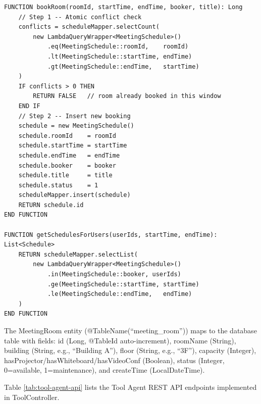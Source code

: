 \begin{table}[H]
\small\singlespacing
\centering
\caption{Pseudocode --- bookRoom() Atomic Conflict Check-and-Insert}
\label{tab:pseudocode-book-room}
\vspace{2mm}

\begin{lstlisting}
FUNCTION bookRoom(roomId, startTime, endTime, booker, title): Long
    // Step 1 -- Atomic conflict check
    conflicts = scheduleMapper.selectCount(
        new LambdaQueryWrapper<MeetingSchedule>()
            .eq(MeetingSchedule::roomId,    roomId)
            .lt(MeetingSchedule::startTime, endTime)
            .gt(MeetingSchedule::endTime,   startTime)
    )
    IF conflicts > 0 THEN
        RETURN FALSE   // room already booked in this window
    END IF
    // Step 2 -- Insert new booking
    schedule = new MeetingSchedule()
    schedule.roomId    = roomId
    schedule.startTime = startTime
    schedule.endTime   = endTime
    schedule.booker    = booker
    schedule.title     = title
    schedule.status    = 1
    scheduleMapper.insert(schedule)
    RETURN schedule.id
END FUNCTION

FUNCTION getSchedulesForUsers(userIds, startTime, endTime): List<Schedule>
    RETURN scheduleMapper.selectList(
        new LambdaQueryWrapper<MeetingSchedule>()
            .in(MeetingSchedule::booker, userIds)
            .ge(MeetingSchedule::startTime, startTime)
            .le(MeetingSchedule::endTime,   endTime)
    )
END FUNCTION
\end{lstlisting}
\end{table}


The MeetingRoom entity (@TableName(``meeting\_room'')) maps to the database table with fields: id (Long, @TableId auto-increment), roomName (String), building (String, e.g., ``Building A''), floor (String, e.g., ``3F''), capacity (Integer), hasProjector/hasWhiteboard/hasVideoConf (Boolean), status (Integer, 0=available, 1=maintenance), and createTime (LocalDateTime).

Table \ref{tab:tool-agent-api} lists the Tool Agent REST API endpoints implemented in ToolController.

\vspace{3mm}

